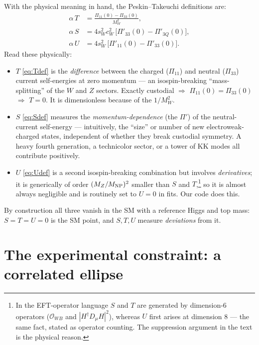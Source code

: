 \documentclass[11pt]{article}
\newcommand{\swsq}{s_W^2}
\newcommand{\cwsq}{c_W^2}
\newcommand{\Pibig}{\Pi}
\theoremstyle{definition}
\begin{document}
With the physical meaning in hand, the Peskin--Takeuchi definitions are:
\begin{align}
\alpha\,T &= \frac{\Pibig_{11}(0) - \Pibig_{33}(0)}{M_W^2},
\label{eq:Tdef}\\[4pt]
\alpha\,S &= 4\swsq\cwsq \,\big[\Pibig'_{33}(0) - \Pibig'_{3Q}(0)\big],
\label{eq:Sdef}\\[4pt]
\alpha\,U &= 4\swsq\,\big[\Pibig'_{11}(0) - \Pibig'_{33}(0)\big].
\label{eq:Udef}
\end{align}
Read these physically:
\begin{itemize}[leftmargin=1.4em]
\item \textbf{$T$} \eqref{eq:Tdef} is the \emph{difference} between the charged
($\Pibig_{11}$) and neutral ($\Pibig_{33}$) current self-energies at zero
momentum --- an isospin-breaking ``mass-splitting'' of the $W$ and $Z$ sectors.
Exactly custodial $\Rightarrow$ $\Pibig_{11}(0)=\Pibig_{33}(0)$ $\Rightarrow$ $T=0$.
It is dimensionless because of the $1/M_W^2$.
\item \textbf{$S$} \eqref{eq:Sdef} measures the \emph{momentum-dependence}
(the $\Pibig'$) of the neutral-current self-energy --- intuitively, the
``size'' or number of new electroweak-charged states, independent of whether
they break custodial symmetry. A heavy fourth generation, a technicolor sector,
or a tower of KK modes all contribute positively.
\item \textbf{$U$} \eqref{eq:Udef} is a second isospin-breaking combination but
involves \emph{derivatives}; it is generically of order $(M_Z/M_{\rm NP})^2$
smaller than $S$ and $T$,\footnote{In the EFT-operator language $S$ and $T$ are
generated by dimension-6 operators ($\mathcal{O}_{WB}$ and
$|H^\dagger D_\mu H|^2$), whereas $U$ first arises at dimension 8 --- the same
fact, stated as operator counting. The suppression argument in the text is the
physical reason.} so it is almost always negligible and is routinely set to
$U=0$ in fits. Our code does this.
\end{itemize}

By construction all three vanish in the SM with a reference Higgs and top mass:
$S=T=U=0$ is the SM point, and $S,T,U$ measure \emph{deviations} from it.

\section{The experimental constraint: a correlated ellipse}
\label{sec:expt}
\end{document}
